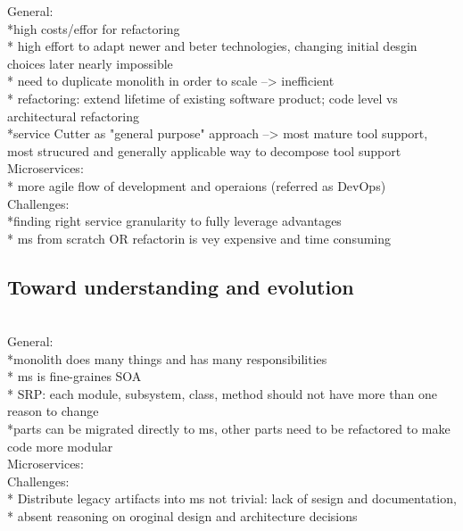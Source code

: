 General:\\
*high costs/effor for refactoring\\
* high effort to adapt newer and beter technologies, changing initial desgin choices later nearly impossible \\
* need to duplicate monolith in order to scale --> inefficient\\
* refactoring: extend lifetime of existing software product; code level vs architectural refactoring\\
*service Cutter as "general purpose" approach --> most mature tool support, most strucured and generally applicable way to decompose tool support\\


Microservices:\\
* more agile flow of development and operaions (referred as DevOps)\\


Challenges:\\
*finding right service granularity to fully leverage advantages\\
* ms from scratch OR refactorin is vey expensive and time consuming\\


\subsection{Toward understanding and evolution}
\cite{TowardsUnderstandingEvolution} \\

General:\\
*monolith  does many things and has many responsibilities \\
* ms is fine-graines SOA\\
* SRP: each module, subsystem, class, method should not have more than one reason to change\\
*parts can be migrated directly to ms, other parts need to be refactored to make code more modular\\

Microservices:\\




Challenges:\\
* Distribute legacy artifacts into ms not trivial: lack of sesign and documentation, \\
* absent reasoning on oroginal design and architecture decisions\\ 

